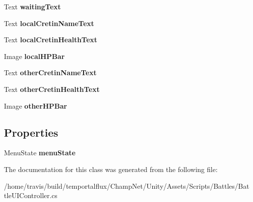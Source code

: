 \begin{DoxyCompactItemize}
\item 
\hypertarget{group__client_ga2f5cb0c646d3675c7c7805381d7e54d2}{Text {\bfseries waiting\-Text}}\label{group__client_ga2f5cb0c646d3675c7c7805381d7e54d2}

\item 
\hypertarget{group__client_ga72b6e8ee777e63e4cbcf7a51cede53ed}{Text {\bfseries local\-Cretin\-Name\-Text}}\label{group__client_ga72b6e8ee777e63e4cbcf7a51cede53ed}

\item 
\hypertarget{group__client_ga77e347d67633680a65e9adf1f790176a}{Text {\bfseries local\-Cretin\-Health\-Text}}\label{group__client_ga77e347d67633680a65e9adf1f790176a}

\item 
\hypertarget{group__client_ga2b64cecb96ddcc2f7dfdeb062ed1869e}{Image {\bfseries local\-H\-P\-Bar}}\label{group__client_ga2b64cecb96ddcc2f7dfdeb062ed1869e}

\item 
\hypertarget{group__client_gad58b390bc1a3e5cf185cbee5d300dcef}{Text {\bfseries other\-Cretin\-Name\-Text}}\label{group__client_gad58b390bc1a3e5cf185cbee5d300dcef}

\item 
\hypertarget{group__client_gad9604d7804d5c5c0bb227bf3b67fc2d4}{Text {\bfseries other\-Cretin\-Health\-Text}}\label{group__client_gad9604d7804d5c5c0bb227bf3b67fc2d4}

\item 
\hypertarget{group__client_gab3cc33d5aeca7b5fca82f8de11ac072e}{Image {\bfseries other\-H\-P\-Bar}}\label{group__client_gab3cc33d5aeca7b5fca82f8de11ac072e}

\end{DoxyCompactItemize}
\subsection*{Properties}
\begin{DoxyCompactItemize}
\item 
\hypertarget{group__client_ga4f8584c7f4ebdeb9b29bf982dc8a5e5d}{Menu\-State {\bfseries menu\-State}}\label{group__client_ga4f8584c7f4ebdeb9b29bf982dc8a5e5d}

\end{DoxyCompactItemize}


The documentation for this class was generated from the following file\-:\begin{DoxyCompactItemize}
\item 
/home/travis/build/temportalflux/\-Champ\-Net/\-Unity/\-Assets/\-Scripts/\-Battles/Battle\-U\-I\-Controller.\-cs\end{DoxyCompactItemize}
